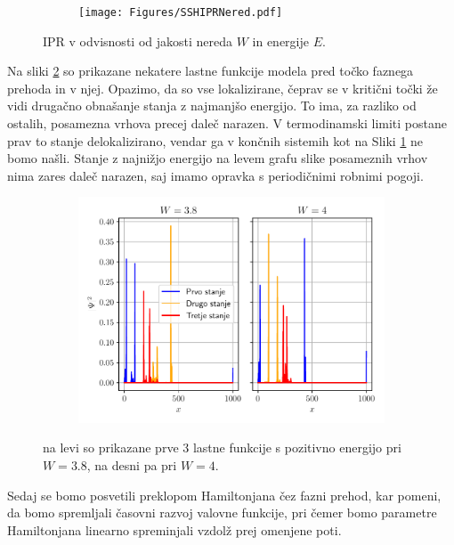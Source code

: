 \begin{figure}[H]
\centering
\begin{subfigure}{.7\textwidth}
\texttt{[image: Figures/SSHIPRNered.pdf]}
\end{subfigure}
\caption{IPR v odvisnosti od jakosti nereda $W$ in energije $E$.}
\label{fig:SSHIPRNered}
\end{figure}
Na sliki \ref{fig:EigenPloti} so prikazane nekatere lastne funkcije modela pred točko faznega prehoda in v njej. Opazimo, da so vse lokalizirane, čeprav se v kritični točki že vidi drugačno obnašanje stanja z najmanjšo energijo. To ima, za razliko od ostalih, posamezna vrhova precej daleč narazen. V termodinamski limiti postane prav to stanje delokalizirano, vendar ga v končnih sistemih kot na Sliki \ref{fig:SSHIPRNered} ne bomo našli. Stanje z najnižjo energijo na levem grafu slike posameznih vrhov nima zares daleč narazen, saj imamo opravka s periodičnimi robnimi pogoji.
\begin{figure}[H]
\centering
\begin{subfigure}{.7\textwidth}
\includegraphics[width=\linewidth]{Figures/EigenPloti.pdf}
\end{subfigure}
\caption{na levi so prikazane prve 3 lastne funkcije s pozitivno energijo pri $W=3.8$, na desni pa pri $W=4$.}
\label{fig:EigenPloti}
\end{figure}
Sedaj se bomo posvetili preklopom Hamiltonjana čez fazni prehod, kar pomeni, da bomo spremljali časovni razvoj valovne funkcije, pri čemer bomo parametre Hamiltonjana linearno spreminjali vzdolž prej omenjene poti.

